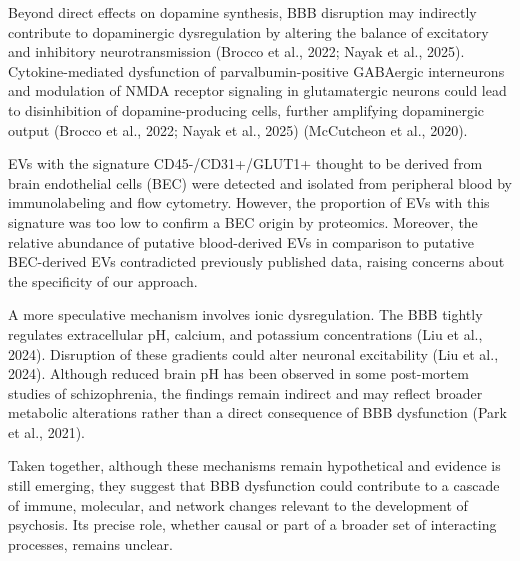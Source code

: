 \documentclass[authordate, empirical]{jote-new-article}
\begin{document}
	Beyond direct effects on dopamine synthesis, BBB disruption may indirectly contribute to dopaminergic dysregulation by altering the balance of excitatory and inhibitory neurotransmission (Brocco et al., 2022; Nayak et al., 2025). Cytokine-mediated dysfunction of parvalbumin-positive GABAergic interneurons and modulation of NMDA receptor signaling in glutamatergic neurons could lead to disinhibition of dopamine-producing cells, further amplifying dopaminergic output (Brocco et al., 2022; Nayak et al., 2025) (McCutcheon et al., 2020).



	\begin{takeHomeMessage}EVs with the signature CD45-/CD31+/GLUT1+ thought to be derived from brain endothelial cells (BEC) were detected and isolated from peripheral blood by immunolabeling and flow cytometry. However, the proportion of EVs with this signature was too low to confirm a BEC origin by proteomics. Moreover, the relative abundance of putative blood-derived EVs in comparison to putative BEC-derived EVs contradicted previously published data, raising concerns about the specificity of our approach.
	\end{takeHomeMessage}

	A more speculative mechanism involves ionic dysregulation. The BBB tightly regulates extracellular pH, calcium, and potassium concentrations (Liu et al., 2024). Disruption of these gradients could alter neuronal excitability (Liu et al., 2024). Although reduced brain pH has been observed in some post-mortem studies of schizophrenia, the findings remain indirect and may reflect broader metabolic alterations rather than a direct consequence of BBB dysfunction (Park et al., 2021).



	Taken together, although these mechanisms remain hypothetical and evidence is still emerging, they suggest that BBB dysfunction could contribute to a cascade of immune, molecular, and network changes relevant to the development of psychosis. Its precise role, whether causal or part of a broader set of interacting processes, remains unclear.
\end{document}
